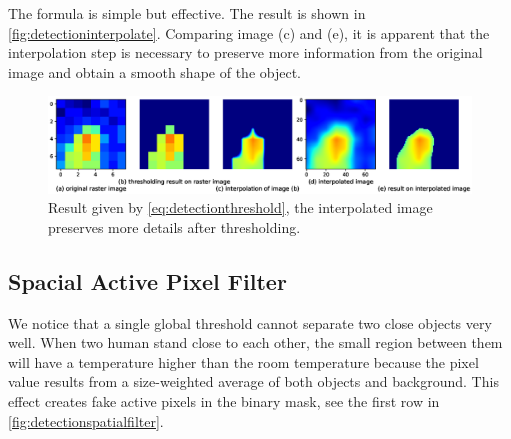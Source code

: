 The formula is simple but effective. The result is shown in \autoref{fig:detectioninterpolate}. Comparing image (c) and (e), it is apparent that the interpolation step is necessary to preserve more information from the original image and obtain a smooth shape of the object.
\begin{figure}
  \centering
  \includegraphics[width=\textwidth]{figures/detect_interpolate.eps}
  \caption{Result given by \autoref{eq:detectionthreshold}, the interpolated image preserves more details after thresholding.}\label{fig:detectioninterpolate}
\end{figure}

\subsection{Spacial Active Pixel Filter}
We notice that a single global threshold cannot separate two close objects very well. When two human stand close to each other, the small region between them will have a temperature higher than the room temperature because the pixel value results from a size-weighted average of both objects and background. This effect creates fake active pixels in the binary mask, see the first row in \autoref{fig:detectionspatialfilter}.

